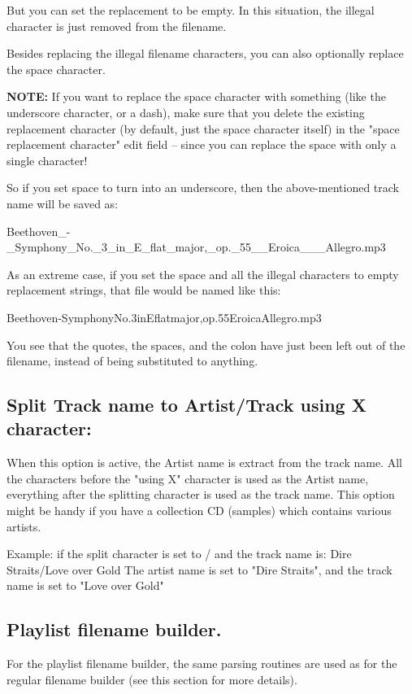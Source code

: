 But you can set the replacement to be empty. In this 
situation, the illegal character is just removed from the filename.

Besides replacing the illegal filename characters, you can also optionally
replace the space character.

{\bf NOTE:}
If you want to replace the space character with something (like the underscore character,
or a dash), make sure that you delete the
existing replacement character (by default, just the space character itself) in the "space replacement character"
edit field -- since you can replace the space with only a single character!

So if you set space to turn into an underscore, then the above-mentioned track
name will be saved as:

Beethoven_-_Symphony_No._3_in_E_flat_major,_op._55__Eroica___Allegro.mp3

As an extreme case, if you set the space and all the illegal characters to empty
replacement strings, that file would be named like this:

Beethoven-SymphonyNo.3inEflatmajor,op.55EroicaAllegro.mp3

You see that the quotes, the spaces, and the colon have just been left out
of the filename, instead of being substituted to anything.


\subsection{Split Track name to Artist/Track using X character:}

When this option is active, the Artist name is extract from the track name. All the
characters before the "using X" character is used as the Artist name, everything after
the splitting character is used as the track name. This option might be handy if you
have a collection CD (samples) which contains various artists.

Example: if the split character is set to / and the track name is:
Dire Straits/Love over Gold
The artist name is set to "Dire Straits", and the track name is set to "Love over Gold"

\subsection{Playlist filename builder.}

For the playlist filename builder, the same parsing routines are used as for the regular
filename builder (see this section for more details).


